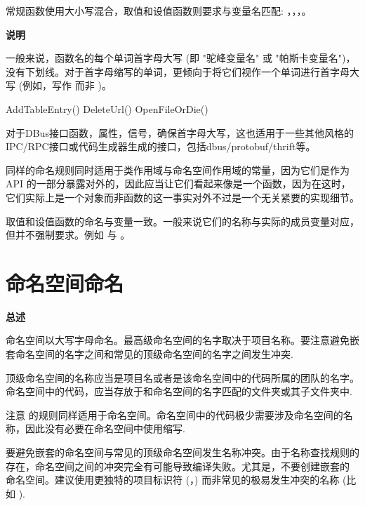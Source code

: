 常规函数使用大小写混合，取值和设值函数则要求与变量名匹配: ，，，。

\textbf{说明}

一般来说，函数名的每个单词首字母大写 (即 "驼峰变量名" 或 "帕斯卡变量名")，没有下划线。对于首字母缩写的单词，更倾向于将它们视作一个单词进行首字母大写 (例如，写作  而非 )。

\begin{cppcode}
  AddTableEntry()
  DeleteUrl()
  OpenFileOrDie()
\end{cppcode}

\begin{DWarn}
  对于DBus接口函数，属性，信号，确保首字母大写，这也适用于一些其他风格的IPC/RPC接口或代码生成器生成的接口，包括dbus/protobuf/thrift等。
\end{DWarn}

同样的命名规则同时适用于类作用域与命名空间作用域的常量，因为它们是作为 API 的一部分暴露对外的，因此应当让它们看起来像是一个函数，因为在这时，它们实际上是一个对象而非函数的这一事实对外不过是一个无关紧要的实现细节。

取值和设值函数的命名与变量一致。一般来说它们的名称与实际的成员变量对应，但并不强制要求。例如  与 。

\section{命名空间命名}

\textbf{总述}
\begin{DWarn}
  命名空间以大写字母命名。最高级命名空间的名字取决于项目名称。要注意避免嵌套命名空间的名字之间和常见的顶级命名空间的名字之间发生冲突.
\end{DWarn}

顶级命名空间的名称应当是项目名或者是该命名空间中的代码所属的团队的名字。命名空间中的代码，应当存放于和命名空间的名字匹配的文件夹或其子文件夹中.

注意  的规则同样适用于命名空间。命名空间中的代码极少需要涉及命名空间的名称，因此没有必要在命名空间中使用缩写.

要避免嵌套的命名空间与常见的顶级命名空间发生名称冲突。由于名称查找规则的存在，命名空间之间的冲突完全有可能导致编译失败。尤其是，不要创建嵌套的  命名空间。建议使用更独特的项目标识符 (，) 而非常见的极易发生冲突的名称 (比如 ).

